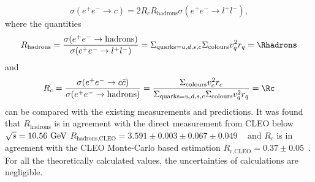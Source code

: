 \begin{appendices}
\begin{equation*}\label{eq:sigmactwo}
\sigma(e^+e^-\rightarrow c)=2 R_c R_{\text{hadrons}} 
\sigma(e^+e^-\rightarrow l^{+}l^{-}),
\end{equation*} where the quantities
\begin{equation*}\label{eq:rh}
R_{\text{hadrons}}=
\frac{\sigma(e^+e^-\rightarrow \text{hadrons})}{\sigma(e^+e^-\rightarrow 
l^+l^-)}=\Sigma_{\text{quarks=}u,d,s,c}\Sigma_{\text{colours}} v_q^2 
r_q=\Rhadrons
\end{equation*}
and 
\begin{equation*}\label{eq:rc}
R_{c}=\frac{\sigma(e^+e^-\rightarrow c\bar{c})}{\sigma(e^+e^-\rightarrow 
\text{hadrons})}=\frac{\Sigma_{\text{colours}} v_c^2 r_c}
{\Sigma_{\text{quarks=}u,d,s,c}\Sigma_{\text{colours}} v_q^2 r_q}=\Rc
\end{equation*}
can be compared with the existing measurements and predictions.
It was found that $R_{\text{hadrons}}$ is in agreement with the direct  
measurement from CLEO below $\sqrt{s}=10.56~{\text{Ge}\kern-0.06667em\text{V\/}}$
$R_{\text{hadrons,CLEO}}=3.591\pm0.003\pm0.067\pm0.049$
~\cite{Besson:2007aa} 
and $R_{c}$ is in  agreement with the CLEO Monte-Carlo based estimation
$R_{\text{c,CLEO}}=0.37\pm0.05$~\cite{Bortoletto:1988kw}.
For all the theoretically calculated values, the 
uncertainties of calculations are negligible.
\FloatBarrier

\end{appendices}
